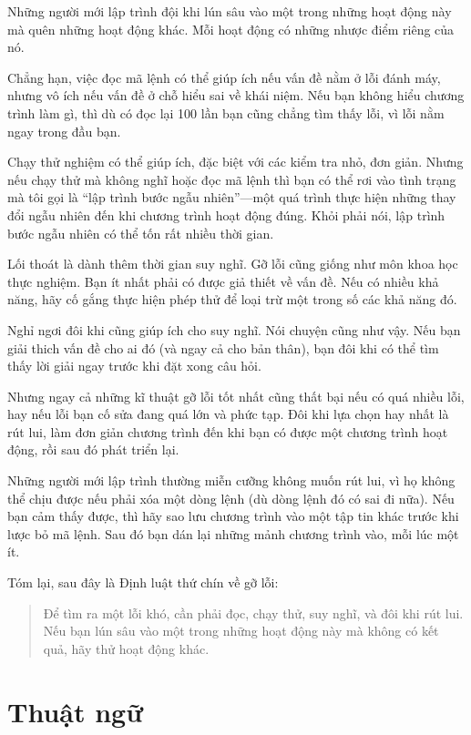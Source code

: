 \documentclass[12pt]{book}
\begin{document}
Những người mới lập trình đội khi lún sâu vào một trong những hoạt
động này mà quên những hoạt động khác. Mỗi hoạt động có những 
nhược điểm riêng của nó.

Chẳng hạn, việc đọc mã lệnh có thể giúp ích nếu vấn đề nằm ở lỗi
đánh máy, nhưng vô ích nếu vấn đề ở chỗ hiểu sai về khái niệm. Nếu
bạn không hiểu chương trình làm gì, thì dù có đọc lại 100 lần bạn
cũng chẳng tìm thấy lỗi, vì lỗi nằm ngay trong đầu bạn.

Chạy thử nghiệm có thể giúp ích, đặc biệt với các kiểm tra nhỏ,
đơn giản. Nhưng nếu chạy thử mà không nghĩ hoặc đọc mã lệnh thì bạn
có thể rơi vào tình trạng mà tôi gọi là ``lập trình bước ngẫu
nhiên''---một quá trình thực hiện những thay đổi ngẫu nhiên đến
khi chương trình hoạt động đúng. Khỏi phải nói, lập trình bước
ngẫu nhiên có thể tốn rất nhiều thời gian.

Lối thoát là dành thêm thời gian suy nghĩ. Gỡ lỗi cũng giống như
môn khoa học thực nghiệm. Bạn ít nhất phải có được giả thiết về
vấn đề. Nếu có nhiều khả năng, hãy cố gắng thực hiện phép thử
để loại trừ một trong số các khả năng đó.

Nghỉ ngơi đôi khi cũng giúp ích cho suy nghĩ. Nói chuyện cũng như
vậy. Nếu bạn giải thich vấn đề cho ai đó (và ngay cả cho bản thân),
bạn đôi khi có thể tìm thấy lời giải ngay trước khi đặt xong câu
hỏi.

Nhưng ngay cả những kĩ thuật gỡ lỗi tốt nhất cũng thất bại nếu có
quá nhiều lỗi, hay nếu lỗi bạn cố sửa đang quá lớn và phức tạp. 
Đôi khi lựa chọn hay nhất là rút lui, làm đơn giản chương trình
đến khi bạn có được một chương trình hoạt động, rồi sau đó phát triển
lại.

Những người mới lập trình thường miễn cưỡng không muốn rút lui,
vì họ không thể chịu được nếu phải xóa một dòng lệnh (dù dòng lệnh
đó có sai đi nữa). Nếu bạn cảm thấy được, thì hãy sao lưu chương trình
vào một tập tin khác trước khi lược bỏ mã lệnh. Sau đó bạn dán 
lại những mảnh chương trình vào, mỗi lúc một ít.

Tóm lại, sau đây là Định luật thứ chín về gỡ lỗi:

\begin{quote}
Để tìm ra một lỗi khó, cần phải đọc, chạy thử, suy nghĩ, và đôi khi
rút lui. Nếu bạn lún sâu vào một trong những hoạt động này mà không
có kết quả, hãy thử hoạt động khác.
\end{quote}



\section{Thuật ngữ}
\end{document}
